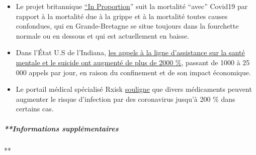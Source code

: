 \begin{itemize}
\item
  Le projet britannique \href{http://inproportion2.talkigy.com/}{``In
  Proportion}'' suit la mortalité ``avec'' Covid19 par rapport à la
  mortalité due à la grippe et à la mortalité toutes causes confondues,
  qui en Grande-Bretagne se situe toujours dans la fourchette normale ou
  en dessous et qui est actuellement en baisse.
\item
  Dans l'État U.S de l'Indiana,
  \href{https://twitter.com/JesseKellyDC/status/1246449878219145216}{les
  appels à la ligne d'assistance sur la santé mentale et le suicide ont
  augmenté de plus de 2000 \%}, passant de 1000 à 25 000 appels par
  jour, en raison du confinement et de son impact économique.
\item
  Le portail médical spécialisé Rxisk
  \href{https://rxisk.org/medications-compromising-covid-infections/}{souligne}
  que divers médicaments peuvent augmenter le risque d'infection par des
  coronavirus jusqu'à 200 \% dans certains cas.
\end{itemize}

\hypertarget{informations-suppluxe9mentaires}{%
\subparagraph{**Informations
supplémentaires}\label{informations-suppluxe9mentaires}}

**

